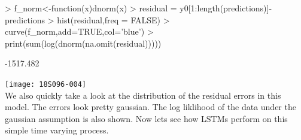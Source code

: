 \documentclass{article}
\begin{document}
\begin{Schunk}
\begin{Sinput}
> f_norm<-function(x){dnorm(x)}
> residual = y0[1:length(predictions)]-predictions
> hist(residual,freq = FALSE)
> curve(f_norm,add=TRUE,col='blue')
> print(sum(log(dnorm(na.omit(residual)))))
\end{Sinput}
\begin{Soutput}
[1] -1517.482
\end{Soutput}
\end{Schunk}
\texttt{[image: 18S096-004]}
\\We also quickly take a look at the distribution of the residual errors in this model. The errors look pretty gaussian. The log liklihood of the data under the gaussian assumption is also shown. Now lets see how LSTMs perform on this simple time varying process.
\end{document}
